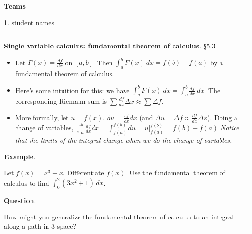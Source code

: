 \documentclass[12pt,letterpaper,noanswers]{exam}
\begin{document}
\noindent\textbf{Teams}

\begin{multicols}{2}

1.  student names
\end{multicols}

\vspace{0.2cm}
\hrule
\vspace{0.2cm}



\noindent\textbf{Single variable calculus: fundamental theorem of calculus}. \S 5.3
\begin{tcolorbox}
\begin{itemize}
\itemsep0em
    \item Let $F(x) = \frac{df}{dx}$ on $[a,b]$.  Then $\displaystyle\int_a^b F(x)\ dx = f(b) - f(a)$ by a fundamental theorem of calculus.
    \item Here's some intuition for this: we have $\displaystyle\int_a^b F(x) \ dx = \int_a^b \frac{df}{dx} \ dx$.  The corresponding Riemann sum is $ \sum \frac{df}{dx}\Delta x \approx \displaystyle\sum \Delta f$.  
    
    \item More formally, let $u = f(x)$.  $\displaystyle du = \frac{df}{dx}dx$ (and $\Delta u = \Delta f \approx \frac{df}{dx}\Delta x$).  Doing a change of variables, $\displaystyle\int_a^b \frac{df}{dx}dx = \int_{f(a)}^{f(b)} du =  \left. u \right\vert_{f(a)}^{f(b)} = f(b) - f(a)$ \emph{Notice that the limits of the integral change when we do the change of variables.}
\end{itemize}
\end{tcolorbox}

\noindent\textbf{Example}.

Let $f(x) = x^3 + x$.  Differentiate $f(x)$.  Use the fundamental theorem of calculus to find $\displaystyle\int_0^2 \left(3x^2 + 1\right)\ dx$.

\vspace{1in}


\noindent\textbf{Question}.

How might you generalize the fundamental theorem of calculus to an integral along a path in 3-space?

\eject
\end{document}
